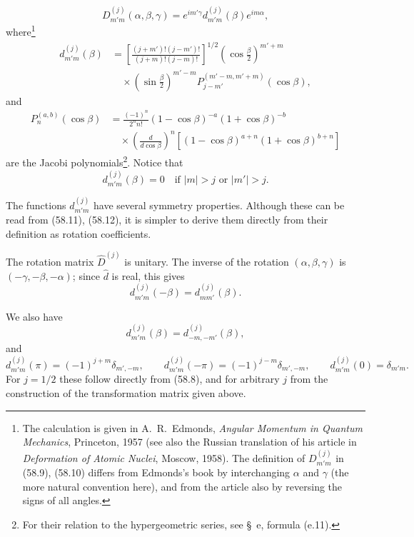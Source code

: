 \begin{equation}
 D^{(j)}_{m'm}(\alpha,\beta,\gamma)=e^{im'\gamma}d^{(j)}_{m'm}(\beta)e^{im\alpha},
 \tag{58.9}
\end{equation}
where\footnote{The calculation is given in A.~R.~Edmonds, \emph{Angular Momentum in Quantum Mechanics}, Princeton, 1957 (see also the Russian translation of his article in \emph{Deformation of Atomic Nuclei}, Moscow, 1958). The definition of $D^{(j)}_{m'm}$ in (58.9), (58.10) differs from Edmonds's book by interchanging $\alpha$ and $\gamma$ (the more natural convention here), and from the article also by reversing the signs of all angles.}
\begin{equation}
 \begin{aligned}
 d^{(j)}_{m'm}(\beta)&=
 \left[\frac{(j+m')!(j-m')!}{(j+m)!(j-m)!}\right]^{1/2}
 \left(\cos\frac\beta2\right)^{m'+m}\\
 &\quad\times\left(\sin\frac\beta2\right)^{m'-m}
 P_{j-m'}^{(m'-m,m'+m)}(\cos\beta),
 \end{aligned}
 \tag{58.10}
\end{equation}
and
\begin{equation}
 \begin{aligned}
 P_n^{(a,b)}(\cos\beta)&=\frac{(-1)^n}{2^n n!}
 (1-\cos\beta)^{-a}(1+\cos\beta)^{-b}\\
 &\quad\times\left(\frac d{d\cos\beta}\right)^n
 [(1-\cos\beta)^{a+n}(1+\cos\beta)^{b+n}]
 \end{aligned}
 \tag{58.11}
\end{equation}
are the Jacobi polynomials\footnote{For their relation to the hypergeometric series, see §~e, formula (e.11).}. Notice that
\begin{equation}
 d^{(j)}_{m'm}(\beta)=0\quad\text{if }|m|>j\text{ or }|m'|>j.
 \tag{58.12}
\end{equation}

The functions $d^{(j)}_{m'm}$ have several symmetry properties. Although these can be read from (58.11), (58.12), it is simpler to derive them directly from their definition as rotation coefficients.

The rotation matrix $\hat D^{(j)}$ is unitary. The inverse of the rotation $(\alpha,\beta,\gamma)$ is $(-\gamma,-\beta,-\alpha)$; since $\hat d$ is real, this gives
\begin{equation}
 d^{(j)}_{m'm}(-\beta)=d^{(j)}_{mm'}(\beta).
 \tag{58.13}
\end{equation}

We also have
\begin{equation}
 d^{(j)}_{m'm}(\beta)=d^{(j)}_{-m,-m'}(\beta),
 \tag{58.14}
\end{equation}
and
\begin{equation}
 d^{(j)}_{m'm}(\pi)=(-1)^{j+m}\delta_{m',-m},\qquad
 d^{(j)}_{m'm}(-\pi)=(-1)^{j-m}\delta_{m',-m},\qquad
 d^{(j)}_{m'm}(0)=\delta_{m'm}.
 \tag{58.15}
\end{equation}
For $j=1/2$ these follow directly from (58.8), and for arbitrary $j$ from the construction of the transformation matrix given above.

